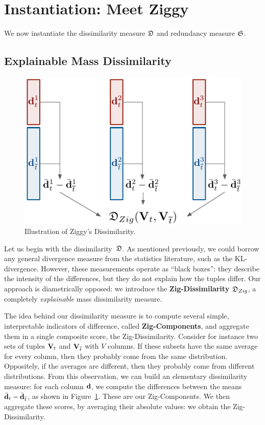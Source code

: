 \section{Instantiation: Meet Ziggy}
\label{sec:instantiation}
We now instantiate the dissimilarity measure $\mathfrak{D}$ and redundancy measure
$\mathfrak{S}$. 

\subsection{Explainable Mass Dissimilarity}
\label{sec:explain}
\begin{figure}
  \centering
  \includegraphics[width=0.7\columnwidth]{Figures/Zig-Dissim}
  \caption{Illustration of Ziggy's Dissimilarity.}
  \label{pic:zigdis}
\end{figure}

Let us begin with the dissimilarity~$\mathfrak{D}$. As mentioned pre\-vious\-ly, we could
borrow any general divergence measure from the statistics literature, such as
the KL-divergence. However, these measurements operate as ``black boxes'': they
describe the intensity of the differences, but they do not explain how the
tuples differ. Our approach is diametrically opposed: we introduce the
\textbf{Zig-Dissimilarity} $\mathfrak{D}_{Zig}$, a completely \emph{explainable}
mass dissimilarity measure.

The idea behind our dissimilarity measure is to compute several simple,
interpretable indicators of difference, called \textbf{Zig-Components}, and
aggregate them in a single compo\-site score, the Zig-Dissimilarity.  Consider
for instance two sets of tuples $\mathbf{V}_t$ and $\mathbf{V}_{\overline{t}}$ with $V$
columns. If these subsets have the same average for every column, then they
probably come from the same distribution. Oppositely, if the averages are
different, then they probably come from different distributions. From this
observation, we can build an elementary dissimilarity measure: for each column
$\bf{d}$, we compute the differences between the means $\bar{\bf{d}}_t -
\bar{\bf{d}}_{\overline{t}}$, as shown in Figure~\ref{pic:zigdis}. These are our
Zig-Components. We then aggregate these scores, by averaging their absolute
values: we obtain the Zig-Dissimilarity.


